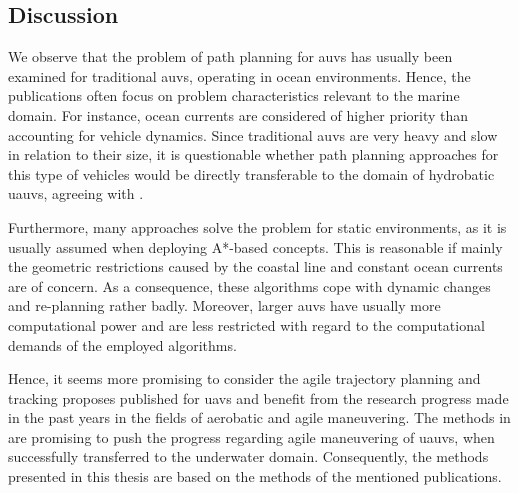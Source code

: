 \subsection{Discussion}



We observe that the problem of path planning for \acp{auv} has usually been examined for traditional \acp{auv}, operating in ocean environments.
Hence, the publications often focus on problem characteristics relevant to the marine domain.
For instance, ocean currents are considered of higher priority than accounting for vehicle dynamics.
Since traditional \acp{auv} are very heavy and slow in relation to their size, it is questionable whether path planning approaches for this type of vehicles would be directly transferable to the domain of hydrobatic \acp{uauv}, agreeing with \cite{hydrobatic}.

Furthermore, many approaches solve the problem for static environments, as it is usually assumed when deploying A*-based concepts. This is reasonable if mainly the geometric restrictions caused by the coastal line and constant ocean currents are of concern. As a consequence, these algorithms cope with dynamic changes and re-planning rather badly. Moreover, larger \acp{auv} have usually more computational power and are less restricted with regard to the computational demands of the employed algorithms.

Hence, it seems more promising to consider the agile trajectory planning and tracking proposes published for \acp{uav} and benefit from the research progress made in the past years in the fields of aerobatic and agile maneuvering. The methods in \cite{Mueller13,MuellerHehn15,Bucki19} are promising to push the progress regarding agile maneuvering of \acp{uauv}, when successfully transferred to the underwater domain. Consequently, the methods presented in this thesis are based on the methods of the mentioned publications.


